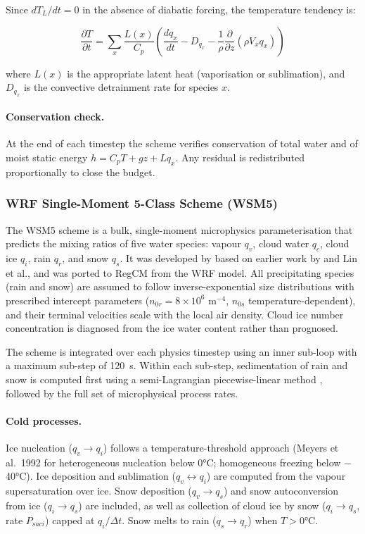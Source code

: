 {Since $dT_L/dt = 0$ in the absence of diabatic forcing, the temperature
tendency is:

\begin{equation}
  \frac{\partial T}{\partial t} = \sum_{x}\frac{L(x)}{C_p}\!\left(
  \frac{dq_x}{dt} - D_{q_x} - \frac{1}{\rho}\frac{\partial}{\partial z}
  (\rho V_x q_x)\right)
\end{equation}

where $L(x)$ is the appropriate latent heat (vaporisation or sublimation),
and $D_{q_x}$ is the convective detrainment rate for species $x$.

\paragraph{Conservation check.}
At the end of each timestep the scheme verifies conservation of total water
and of moist static energy $h = C_p T + gz + L q_x$.  Any residual is
redistributed proportionally to close the budget.

\subsubsection{WRF Single-Moment 5-Class Scheme (WSM5)}
\label{sec:wsm5}

The WSM5 scheme \citep{Hong_04} is a bulk, single-moment microphysics
parameterisation that predicts the mixing ratios of five water species: vapour
$q_v$, cloud water $q_c$, cloud ice $q_i$, rain $q_r$, and snow $q_s$.  It
was developed by \cite{Hong_04} based on earlier work by \cite{Dudhia_89} and
Lin et al., and was ported to RegCM from the WRF model.  All precipitating
species (rain and snow) are assumed to follow inverse-exponential size
distributions with prescribed intercept parameters ($n_{0r} = 8\times10^6$
m$^{-4}$, $n_{0s}$ temperature-dependent), and their terminal velocities scale
with the local air density.  Cloud ice number concentration is diagnosed from
the ice water content rather than prognosed.

The scheme is integrated over each physics timestep using an inner sub-loop
with a maximum sub-step of 120~s.  Within each sub-step, sedimentation of rain
and snow is computed first using a semi-Lagrangian piecewise-linear method
\citep{Juang_10}, followed by the full set of microphysical process rates.

\paragraph{Cold processes.}
Ice nucleation ($q_v \to q_i$) follows a temperature-threshold approach
(Meyers et al.\ 1992 for heterogeneous nucleation below 0°C; homogeneous
freezing below $-$40°C).  Ice deposition and sublimation ($q_v \leftrightarrow
q_i$) are computed from the vapour supersaturation over ice.  Snow deposition
($q_v \to q_s$) and snow autoconversion from ice ($q_i \to q_s$) are included,
as well as collection of cloud ice by snow ($q_i \to q_s$, rate $P_{saci}$)
capped at $q_i/\Delta t$.  Snow melts to rain ($q_s \to q_r$) when $T > 0$°C.

}
